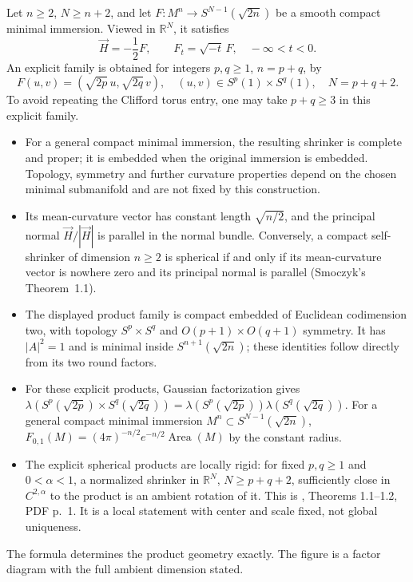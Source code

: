 \begin{example}\label{ex:catalogue-spherical-minimal}
Let $n\geq2$, $N\geq n+2$, and let $F:M^n\to S^{N-1}(\sqrt{2n})$ be a smooth
compact minimal immersion. Viewed in $\mathbb R^N$, it satisfies
\[
 \vec H=-\frac12F,
 \qquad F_t=\sqrt{-t}\,F,\quad -\infty<t<0.
\]
An explicit family is obtained for integers $p,q\geq1$, $n=p+q$, by
\[
 F(u,v)=(\sqrt{2p}\,u,\sqrt{2q}\,v),
 \quad (u,v)\in S^p(1)\times S^q(1),
 \quad N=p+q+2.
\]
To avoid repeating the Clifford torus entry, one may take $p+q\geq3$
in this explicit family.
\begin{itemize}
\item For a general compact minimal immersion, the resulting shrinker is
complete and proper; it is embedded when the original immersion is
embedded. Topology, symmetry and further curvature properties depend
on the chosen minimal submanifold and are not fixed by this construction.
\item Its mean-curvature vector has constant length $\sqrt{n/2}$, and
the principal normal $\vec H/|\vec H|$ is parallel in the normal bundle.
Conversely, a compact self-shrinker of dimension $n\geq2$ is spherical
if and only if its mean-curvature vector is nowhere zero and its
principal normal is parallel (Smoczyk's Theorem~1.1).
\item The displayed product family is compact embedded of Euclidean
codimension two, with topology $S^p\times S^q$ and
$O(p+1)\times O(q+1)$ symmetry. It has $|A|^2=1$ and is minimal
inside $S^{n+1}(\sqrt{2n})$; these identities follow directly from its
two round factors.
\item For these explicit products, Gaussian factorization gives
$\lambda(S^p(\sqrt{2p})\times S^q(\sqrt{2q}))=\lambda(S^p(\sqrt{2p}))\lambda(S^q(\sqrt{2q}))$.
For a general compact minimal immersion $M^n\subset S^{N-1}(\sqrt{2n})$,
$F_{0,1}(M)=(4\pi)^{-n/2}e^{-n/2}\operatorname{Area}(M)$ by the constant radius.
\item The explicit spherical products are locally rigid: for fixed $p,q\geq1$ and $0<\alpha<1$, a normalized shrinker in $\mathbb R^N$, $N\geq p+q+2$, sufficiently close in $C^{2,\alpha}$ to the product is an ambient rotation of it. This is \cite{CatSunZhu2025}, Theorems 1.1--1.2, PDF p.~1. It is a local statement with center and scale fixed, not global uniqueness.
\end{itemize}
The formula determines the product geometry exactly. The figure is a
factor diagram with the full ambient dimension stated.
\end{example}

